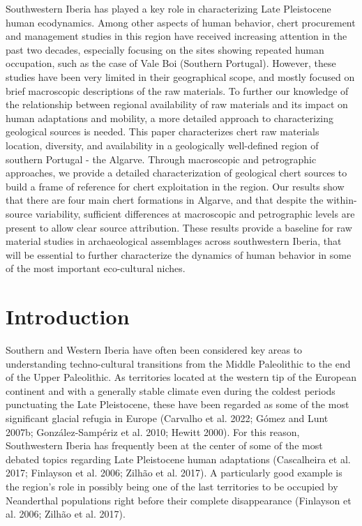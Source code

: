 \documentclass[
  a4paper,
  DIV=11,
  numbers=noendperiod]{scrreprt}
\begin{document}
Southwestern Iberia has played a key role in characterizing Late
Pleistocene human ecodynamics. Among other aspects of human behavior,
chert procurement and management studies in this region have received
increasing attention in the past two decades, especially focusing on the
sites showing repeated human occupation, such as the case of Vale Boi
(Southern Portugal). However, these studies have been very limited in
their geographical scope, and mostly focused on brief macroscopic
descriptions of the raw materials. To further our knowledge of the
relationship between regional availability of raw materials and its
impact on human adaptations and mobility, a more detailed approach to
characterizing geological sources is needed. This paper characterizes
chert raw materials location, diversity, and availability in a
geologically well-defined region of southern Portugal - the Algarve.
Through macroscopic and petrographic approaches, we provide a detailed
characterization of geological chert sources to build a frame of
reference for chert exploitation in the region. Our results show that
there are four main chert formations in Algarve, and that despite the
within-source variability, sufficient differences at macroscopic and
petrographic levels are present to allow clear source attribution. These
results provide a baseline for raw material studies in archaeological
assemblages across southwestern Iberia, that will be essential to
further characterize the dynamics of human behavior in some of the most
important eco-cultural niches.

\section*{Introduction}\label{introduction-1}


Southern and Western Iberia have often been considered key areas to
understanding techno-cultural transitions from the Middle Paleolithic to
the end of the Upper Paleolithic. As territories located at the western
tip of the European continent and with a generally stable climate even
during the coldest periods punctuating the Late Pleistocene, these have
been regarded as some of the most significant glacial refugia in Europe
(Carvalho et al. 2022; Gómez and Lunt 2007b; González-Sampériz et al.
2010; Hewitt 2000). For this reason, Southwestern Iberia has frequently
been at the center of some of the most debated topics regarding Late
Pleistocene human adaptations (Cascalheira et al. 2017; Finlayson et al.
2006; Zilhão et al. 2017). A particularly good example is the region's
role in possibly being one of the last territories to be occupied by
Neanderthal populations right before their complete disappearance
(Finlayson et al. 2006; Zilhão et al. 2017).
\end{document}
